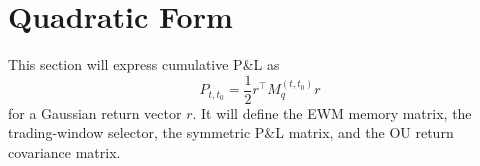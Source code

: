 \section{Quadratic Form}

This section will express cumulative P\&L as
\[
P_{t,t_0} = \frac{1}{2} r^\top M_q^{(t,t_0)} r
\]
for a Gaussian return vector \(r\). It will define the EWM memory matrix, the trading-window selector, the symmetric P\&L matrix, and the OU return covariance matrix.
